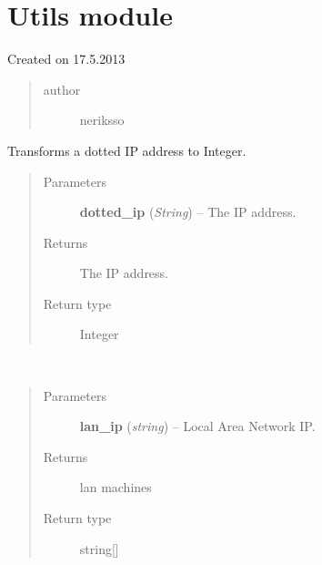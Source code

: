 \documentclass[letterpaper,10pt,english]{sphinxmanual}
\begin{document}
\section{Utils module}
\label{utils:utils-module}\label{utils:module-utils}\label{utils::doc}
Created on 17.5.2013
\begin{quote}\begin{description}
\item[{author}] \leavevmode
neriksso

\end{description}\end{quote}

\begin{fulllineitems}
\label{utils:utils.DottedIPToInt}
Transforms a dotted IP address to Integer.
\begin{quote}\begin{description}
\item[{Parameters}] \leavevmode
\textbf{dotted\_ip} (\emph{String}) -- The IP address.

\item[{Returns}] \leavevmode
The IP address.

\item[{Return type}] \leavevmode
Integer

\end{description}\end{quote}

\end{fulllineitems}


\begin{fulllineitems}
\label{utils:utils.GetLANMachines}~\begin{quote}\begin{description}
\item[{Parameters}] \leavevmode
\textbf{lan\_ip} (\emph{string}) -- Local Area Network IP.

\item[{Returns}] \leavevmode
lan machines

\item[{Return type}] \leavevmode
string{[}{]}

\end{description}\end{quote}

\end{fulllineitems}
\end{document}
